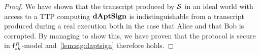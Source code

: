 \begin{proof}
    We have shown that the transcript produced by $\mathcal{S}$ in an ideal world with access to a TTP computing $\mathbf{dAptSign}$ is indistinguishable from a transcript produced during a real execution both in the case that Alice and that Bob is corrupted.
    By managing to show this, we have proven that the protocol is secure in $\mathsf{f}^{\mathit{R}}_{zk}$-model and~\cref{lem:sig:daptsign} therefore holds.
\end{proof}